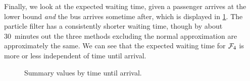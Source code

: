 Finally, we look at the expected waiting time, given a passenger arrives at the lower bound \emph{and} the bus arrives sometime after, which is displayed in \cref{fig:model_results_pr_time}. The particle filter has a consistently shorter waiting time, though by about 30~minutes out the three methods excluding the normal approximation are approximately the same. We can see that the expected waiting time for $\mathcal{F}_4$ is more or less independent of time until arrival.



\begin{knitrout}
\color{fgcolor}\begin{figure}
\newline
{}\newline
{}\caption[Summary values by time until arrival]{Summary values by time until arrival.}\label{fig:model_results_pr_time}
\end{figure}


\end{knitrout}


